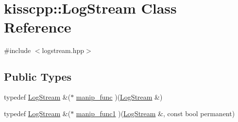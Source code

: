\hypertarget{classkisscpp_1_1_log_stream}{\section{kisscpp\-:\-:Log\-Stream Class Reference}
\label{classkisscpp_1_1_log_stream}
}


{\ttfamily \#include $<$logstream.\-hpp$>$}

\subsection*{Public Types}
\begin{DoxyCompactItemize}
\item 
typedef \hyperlink{classkisscpp_1_1_log_stream}{Log\-Stream} \&($\ast$ \hyperlink{classkisscpp_1_1_log_stream_abb058ef2b1b57fb7e0b89c3312794ada}{manip\-\_\-func} )(\hyperlink{classkisscpp_1_1_log_stream}{Log\-Stream} \&)
\item 
typedef \hyperlink{classkisscpp_1_1_log_stream}{Log\-Stream} \&($\ast$ \hyperlink{classkisscpp_1_1_log_stream_ab6994c757d4c63c4388a932cf2be2c9d}{manip\-\_\-func1} )(\hyperlink{classkisscpp_1_1_log_stream}{Log\-Stream} \&, const bool permanent)
\end{DoxyCompactItemize}
